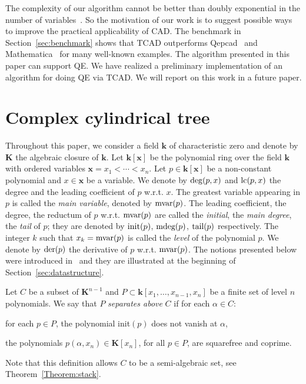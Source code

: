 \documentclass[10pt]{article}
\def\K {\ensuremath{\mathbf{k}}}
\def\KK {\ensuremath{\mathbf{K}}}
\newcommand{\xx}{\mathbf{x}}
\newcommand{\init}[1]{\mbox{{\rm init}$(#1)$}}
\newcommand{\mdeg}[1]{\mbox{{\rm mdeg}$(#1)$}}
\newcommand{\mvar}[1]{\mbox{{\rm mvar}$(#1)$}}
\newcommand{\tail}[1]{\mbox{{\rm tail}$(#1)$}}
\newcommand{\der}[1]{\mbox{{\rm der}$(#1)$}}
\newcommand{\TCAD}{{\sc TCAD}}
\newcommand{\QE}{{QE}}
\newcommand{\QEPCAD}{{\sc Qepcad}}
\begin{document}
The complexity of our algorithm cannot be better 
than doubly exponential in the number of variables~\cite{BrownDavenport2007}.
So the motivation of our work is to suggest possible ways 
to improve the practical applicability of CAD.
The benchmark in Section~\ref{sec:benchmark} shows that {\TCAD}
outperforms {\QEPCAD}~\cite{QEPCAD,Bro03} and {\sf Mathematica}~\cite{adam00}
for many well-known examples. 
The algorithm presented in this paper can support {\QE}. 
We have realized a preliminary implementation of an algorithm for doing {\QE}
via {\TCAD}. We will report on this work in a future paper.

\section{Complex cylindrical tree}
\label{sec:complex}

Throughout this paper, we consider a field $\K$ of characteristic zero and
denote by $\KK$ the algebraic closure of $\K$.
Let $\K[\xx]$ be the polynomial ring over the
field $\K$ with ordered variables $\xx= x_1 < \cdots < x_n$. Let $p\in {\K}[\xx]$ be
a non-constant polynomial and $x \in \xx$ be a variable.
We denote by ${\rm deg}(p,x)$ and ${\rm lc}(p,x)$
the degree and the leading coefficient of $p$ w.r.t. $x$.
The greatest variable appearing in $p$ is
called the {\em main variable}, denoted by $\mvar{p}$. 
The leading coefficient, the degree, the reductum of  $p$ w.r.t. $\mvar{p}$ are
called the {\em initial}, the {\em main degree}, the {\em tail} of $p$; 
they are denoted by $\init{p}$, $\mdeg{p}$, $\tail{p}$ respectively. 
The integer $k$ such that $x_k=\mvar{p}$ is called 
the {\em level} of the polynomial $p$.
We denote by $\der{p}$ the derivative  of $p$ w.r.t. $\mvar{p}$.
The notions presented below were introduced
in~\cite{CMXY09} and they are illustrated at the beginning
of Section~\ref{sec:datastructure}.

\smallskip{}
Let $C$ be a subset of $\KK^{n-1}$
and ${P}\subset\K[x_1,\ldots,x_{n-1}, x_n]$ be a finite set of level $n$ 
polynomials.
We say that $P$ {\em separates above} $C$ if for each $\alpha\in C$:
\begin{itemizeshort}
\item for each $p\in{P}$, the polynomial \init{p} 
      does not vanish at $\alpha$, 
\item the polynomials $p(\alpha,x_n) \in \KK[x_n]$, for all $p\in{P}$, 
              are squarefree and coprime.
\end{itemizeshort}
Note that this definition allows $C$ to be a semi-algebraic set, 
see Theorem~\ref{Theorem:stack}.
\end{document}
